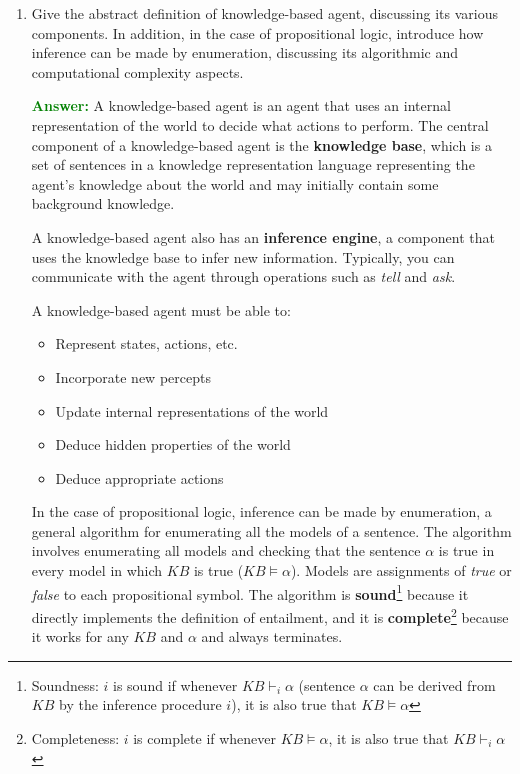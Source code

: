 \documentclass[12pt]{article}
\begin{document}
\begin{enumerate}[label=\textbf{PL.\arabic*}]
    \item Give the abstract definition of knowledge-based agent, discussing its various components.
          In addition, in the case of propositional logic, introduce how inference can be made by enumeration, discussing its algorithmic and computational complexity aspects.

          \textcolor{green}{\textbf{Answer:}}
          A knowledge-based agent is an agent that uses an internal representation of the world to decide what actions to perform. The central component of a knowledge-based agent is the \textbf{knowledge base}, which is a set of sentences in a knowledge representation language representing the agent's knowledge about the world and may initially contain some background knowledge.

          A knowledge-based agent also has an \textbf{inference engine}, a component that uses the knowledge base to infer new information. Typically, you can communicate with the agent through operations such as \textit{tell} and \textit{ask}.

          A knowledge-based agent must be able to:
          \begin{itemize}
              \item Represent states, actions, etc.
              \item Incorporate new percepts
              \item Update internal representations of the world
              \item Deduce hidden properties of the world
              \item Deduce appropriate actions
          \end{itemize}

          In the case of propositional logic, inference can be made by enumeration, a general algorithm for enumerating all the models of a sentence. The algorithm involves enumerating all models and checking that the sentence $\alpha$ is true in every model in which $KB$ is true ($KB\vDash \alpha$). Models are assignments of \textit{true} or \textit{false} to each propositional symbol. The algorithm is \textbf{sound}\footnote{Soundness: $i$ is sound if whenever $KB\vdash_i\alpha$ (sentence $\alpha$ can be derived from $KB$ by the inference procedure $i$), it is also true that $KB\vDash\alpha$} because it directly implements the definition of entailment, and it is \textbf{complete}\footnote{Completeness: $i$ is complete if whenever $KB\vDash\alpha$, it is also true that $KB\vdash_i\alpha$} because it works for any $KB$ and $\alpha$ and always terminates.


\end{enumerate}
\end{document}
